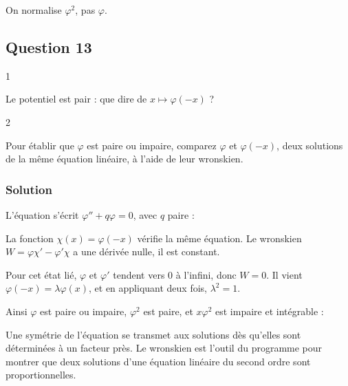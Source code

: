 \documentclass[11pt,a4paper]{article}
\newcommand{\equationajustee}[1]{%
  \sbox{\boiteequation}{$\displaystyle #1$}%
  \ifdim\wd\boiteequation>\linewidth
    \[\resizebox{\linewidth}{!}{\usebox{\boiteequation}}\]%
  \else
    \[#1\]%
  \fi}
\begin{document}
\begin{piege}

On normalise \(\varphi^2\), pas \(\varphi\).

\end{piege}

\hypertarget{question-13}{%
\subsection{Question 13}\label{question-13}}

\begin{indication}{1}

Le potentiel est pair : que dire de \(x\mapsto\varphi(-x)\) ?

\end{indication}

\begin{indication}{2}

Pour établir que \(\varphi\) est paire ou impaire, comparez \(\varphi\) et \(\varphi(-x)\), deux solutions de la même équation linéaire, à l'aide de leur wronskien.

\end{indication}

\hypertarget{solution-12}{%
\subsubsection{Solution}\label{solution-12}}

L'équation s'écrit \(\varphi''+q\varphi=0\), avec \(q\) paire :

\equationajustee{q(x)=\frac{2m}{\hbar^2}\left(E-\frac12m\omega_0^2x^2\right)}

La fonction \(\chi(x)=\varphi(-x)\) vérifie la même équation. Le wronskien \(W=\varphi\chi'-\varphi'\chi\) a une dérivée nulle, il est constant.

Pour cet état lié, \(\varphi\) et \(\varphi'\) tendent vers 0 à l'infini, donc \(W=0\). Il vient \(\varphi(-x)=\lambda\varphi(x)\), et en appliquant deux fois, \(\lambda^2=1\).

Ainsi \(\varphi\) est paire ou impaire, \(\varphi^2\) est paire, et \(x\varphi^2\) est impaire et intégrable :

\equationajustee{\boxed{\langle x\rangle=\int_{-\infty}^{+\infty}x\,\varphi(x)^2\,dx=0}}

\begin{methode}

Une symétrie de l'équation se transmet aux solutions dès qu'elles sont déterminées à un facteur près. Le wronskien est l'outil du programme pour montrer que deux solutions d'une équation linéaire du second ordre sont proportionnelles.

\end{methode}
\end{document}
